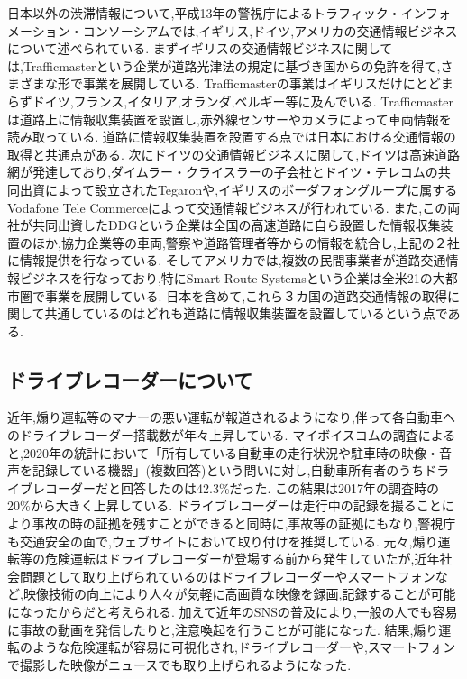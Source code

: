 日本以外の渋滞情報について,平成13年の警視庁によるトラフィック・インフォメーション・コンソーシアムでは,イギリス,ドイツ,アメリカの交通情報ビジネスについて述べられている\cite{traffic_buisiness}.
まずイギリスの交通情報ビジネスに関しては,Trafficmasterという企業が道路光津法の規定に基づき国からの免許を得て,さまざまな形で事業を展開している.
Trafficmasterの事業はイギリスだけにとどまらずドイツ,フランス,イタリア,オランダ,ベルギー等に及んでいる.
Trafficmasterは道路上に情報収集装置を設置し,赤外線センサーやカメラによって車両情報を読み取っている.
道路に情報収集装置を設置する点では日本における交通情報の取得と共通点がある.
次にドイツの交通情報ビジネスに関して,ドイツは高速道路網が発達しており,ダイムラー・クライスラーの子会社とドイツ・テレコムの共同出資によって設立されたTegaronや,イギリスのボーダフォングループに属するVodafone Tele Commerceによって交通情報ビジネスが行われている.
また,この両社が共同出資したDDGという企業は全国の高速道路に自ら設置した情報収集装置のほか,協力企業等の車両,警察や道路管理者等からの情報を統合し,上記の２社に情報提供を行なっている.
そしてアメリカでは,複数の民間事業者が道路交通情報ビジネスを行なっており,特にSmart Route Systemsという企業は全米21の大都市圏で事業を展開している.
日本を含めて,これら３カ国の道路交通情報の取得に関して共通しているのはどれも道路に情報収集装置を設置しているという点である.



\subsection{ドライブレコーダーについて}
近年,煽り運転等のマナーの悪い運転が報道されるようになり,伴って各自動車へのドライブレコーダー搭載数が年々上昇している.\cite{drareco_hukyu}
マイボイスコム\cite{myvoicecom}の調査によると,2020年の統計において「所有している自動車の走行状況や駐車時の映像・音声を記録している機器」(複数回答)という問いに対し,自動車所有者のうちドライブレコーダーだと回答したのは42.3\%だった.
この結果は2017年の調査時の20\%から大きく上昇している.
ドライブレコーダーは走行中の記録を撮ることにより事故の時の証拠を残すことができると同時に,事故等の証拠にもなり,警視庁も交通安全の面で,ウェブサイトにおいて取り付けを推奨している.
元々,煽り運転等の危険運転はドライブレコーダーが登場する前から発生していたが,近年社会問題として取り上げられているのはドライブレコーダーやスマートフォンなど,映像技術の向上により人々が気軽に高画質な映像を録画,記録することが可能になったからだと考えられる.
加えて近年のSNSの普及により,一般の人でも容易に事故の動画を発信したりと,注意喚起を行うことが可能になった.
結果,煽り運転のような危険運転が容易に可視化され,ドライブレコーダーや,スマートフォンで撮影した映像がニュースでも取り上げられるようになった.

